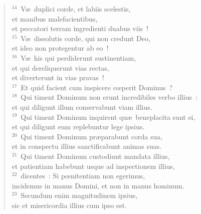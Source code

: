 \begin{flushleft}\begin{verse}${}^{14}$~V\ae\ duplici corde, et labiis scelestis,\\ et manibus malefacientibus,\\ et peccatori terram ingredienti duabus viis~!\\
${}^{15}$~V\ae\ dissolutis corde, qui non credunt Deo,\\ et ideo non protegentur ab eo~!\\
${}^{16}$~V\ae\ his qui perdiderunt sustinentiam,\\ et qui dereliquerunt vias rectas,\\ et diverterunt in vias pravas~!\\
${}^{17}$~Et quid facient cum inspicere cœperit Dominus~?\\
${}^{18}$~Qui timent Dominum non erunt incredibiles verbo illius~:\\ et qui diligunt illum conservabunt viam illius.\\
${}^{19}$~Qui timent Dominum inquirent qu\ae\ beneplacita sunt ei,\\ et qui diligunt eum replebuntur lege ipsius.\\
${}^{20}$~Qui timent Dominum pr\ae parabunt corda sua,\\ et in conspectu illius sanctificabunt animas suas.\\
${}^{21}$~Qui timent Dominum custodiunt mandata illius,\\ et patientiam habebunt usque ad inspectionem illius,\\
${}^{22}$~dicentes~: Si pœnitentiam non egerimus,\\ incidemus in manus Domini, et non in manus hominum.\\
${}^{23}$~Secundum enim magnitudinem ipsius,\\ sic et misericordia illius cum ipso est.\end{verse}\end{flushleft}


